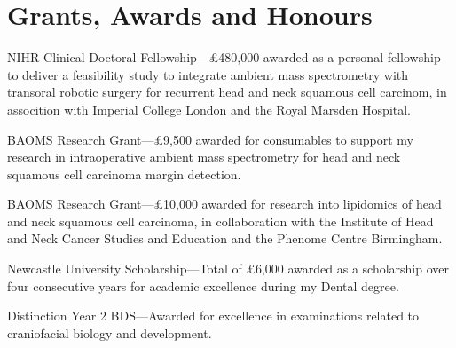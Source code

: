 \section*{Grants, Awards and Honours}

 NIHR Clinical Doctoral Fellowship---\pounds480,000 awarded as a personal fellowship to deliver a feasibility study to integrate ambient mass spectrometry with transoral robotic surgery for recurrent head and neck squamous cell carcinom, in assocition with Imperial College London and the Royal Marsden Hospital.

 BAOMS Research Grant---\pounds9,500 awarded for consumables to support my research in intraoperative ambient mass spectrometry for head and neck squamous cell carcinoma margin detection.

 BAOMS Research Grant---\pounds10,000 awarded for research into lipidomics of head and neck squamous cell carcinoma, in collaboration with the Institute of Head and Neck Cancer Studies and Education and the Phenome Centre Birmingham.

 Newcastle University Scholarship---Total of \pounds6,000 awarded as a scholarship over four consecutive years for academic excellence during my Dental degree.

 Distinction Year 2 BDS---Awarded for excellence in examinations related to craniofacial biology and development.
